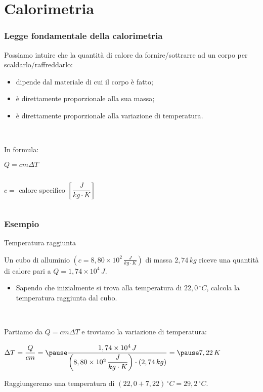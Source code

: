 \documentclass[]{beamer}
\theoremstyle{plain}
\begin{document}
\section{Calorimetria}


\begin{frame}
\frametitle{Legge fondamentale della calorimetria}
Possiamo intuire che la quantità di calore da fornire/sottrarre ad un corpo per scaldarlo/raffreddarlo:
\begin{itemize}
  \item \alert<1>{dipende dal materiale} di cui il corpo è fatto;\pause
  \item è \alert<2>{direttamente proporzionale alla sua massa};\pause
  \item è \alert<3>{direttamente proporzionale alla variazione di temperatura}.\pause
\end{itemize}

~

In formula:
\begin{center}
\colorbox{blue!30}{$ Q = c  m  \Delta T $}
\end{center}

\begin{columns}
\begin{column}{0.45\textwidth}
$ c = $ calore specifico $ \left[ \dfrac{J}{kg \cdot K} \right] $
\end{column}
\begin{column}{0.45\textwidth}
\end{column}
\end{columns}
\end{frame}


\begin{frame}
\frametitle{Esempio}
\begin{exampleblock}{Temperatura raggiunta}
{\small Un cubo di alluminio $\left( c = 8,80 \times 10^2 \, \frac{J}{kg \cdot K} \right)$ di massa $ 2,74 \, kg $ riceve una quantità di calore pari a $ Q = 1,74 \times 10^4 \, J $.
\begin{itemize}
  \item Sapendo che inizialmente si trova alla temperatura di $ 22,0 \, ^\circ C $, calcola la temperatura raggiunta dal cubo.
\end{itemize}
}
\end{exampleblock}\pause

~

Partiamo da $ Q = cm\Delta T $ e troviamo la variazione di temperatura:\pause
\begin{center}
$ \Delta T = \dfrac{Q}{cm} = \pause \dfrac{1,74 \times 10^4 \, J}{\left( 8,80 \times 10^2 \, \dfrac{J}{kg \cdot K} \right)\cdot (2,74 \, kg)} = \pause 7,22 \, K $
\end{center}\pause
Raggiungeremo una temperatura di $ (22,0 + 7,22) \, ^\circ C = 29,2 \, ^\circ C $.
\end{frame}
\end{document}
